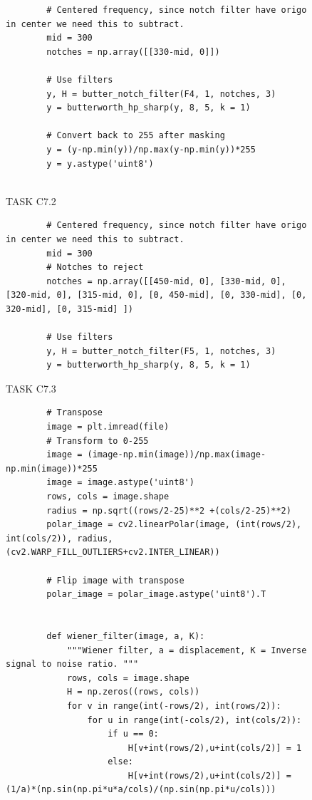 {\begin{figure}[H]
    \begin{lstlisting}
        # Centered frequency, since notch filter have origo in center we need this to subtract.
        mid = 300 
        notches = np.array([[330-mid, 0]])
        
        # Use filters
        y, H = butter_notch_filter(F4, 1, notches, 3)
        y = butterworth_hp_sharp(y, 8, 5, k = 1)
        
        # Convert back to 255 after masking
        y = (y-np.min(y))/np.max(y-np.min(y))*255
        y = y.astype('uint8')
        
    \end{lstlisting}
\caption{TASK C7.2}
\label{TASK C7.2}
\end{figure}


\begin{figure}[H]
    \begin{lstlisting}
        # Centered frequency, since notch filter have origo in center we need this to subtract.
        mid = 300 
        # Notches to reject
        notches = np.array([[450-mid, 0], [330-mid, 0], [320-mid, 0], [315-mid, 0], [0, 450-mid], [0, 330-mid], [0, 320-mid], [0, 315-mid] ])
        
        # Use filters
        y, H = butter_notch_filter(F5, 1, notches, 3)
        y = butterworth_hp_sharp(y, 8, 5, k = 1)
    \end{lstlisting}
\caption{TASK C7.3}
\label{TASK C7.3}
\end{figure}



\begin{figure}[H]
    \begin{lstlisting}
        # Transpose
        image = plt.imread(file)
        # Transform to 0-255
        image = (image-np.min(image))/np.max(image-np.min(image))*255
        image = image.astype('uint8')
        rows, cols = image.shape
        radius = np.sqrt((rows/2-25)**2 +(cols/2-25)**2)
        polar_image = cv2.linearPolar(image, (int(rows/2), int(cols/2)), radius, (cv2.WARP_FILL_OUTLIERS+cv2.INTER_LINEAR))
        
        # Flip image with transpose
        polar_image = polar_image.astype('uint8').T
        
        
        def wiener_filter(image, a, K):
            """Wiener filter, a = displacement, K = Inverse signal to noise ratio. """
            rows, cols = image.shape
            H = np.zeros((rows, cols))
            for v in range(int(-rows/2), int(rows/2)):
                for u in range(int(-cols/2), int(cols/2)):
                    if u == 0:
                        H[v+int(rows/2),u+int(cols/2)] = 1
                    else:
                        H[v+int(rows/2),u+int(cols/2)] = (1/a)*(np.sin(np.pi*u*a/cols)/(np.sin(np.pi*u/cols)))
        

\end{lstlisting}
\end{figure}}
